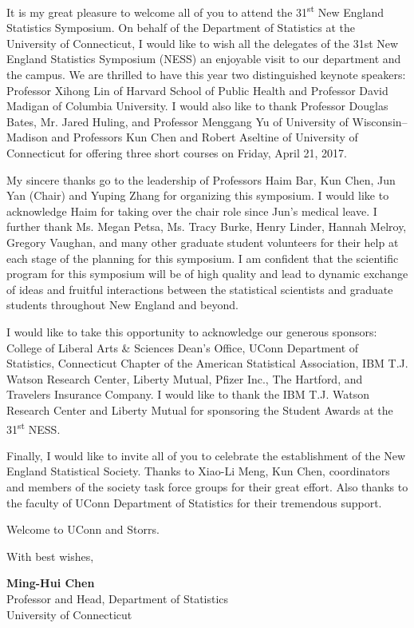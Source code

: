 It is my great pleasure to welcome all of you to attend the
31\textsuperscript{st} New England Statistics Symposium.  On behalf of
the Department of Statistics at the University of Connecticut, I would
like to wish all the delegates of the 31st New England Statistics
Symposium (NESS) an enjoyable visit to our department and the
campus. We are thrilled to have this year two distinguished keynote
speakers: Professor Xihong Lin of Harvard School of Public Health and
Professor David Madigan of Columbia University. I would also like to
thank Professor Douglas Bates, Mr. Jared Huling, and Professor
Menggang Yu of University of Wisconsin–Madison and Professors Kun Chen
and Robert Aseltine of University of Connecticut for offering three
short courses on Friday, April 21, 2017.

My sincere thanks go to the leadership of Professors Haim Bar, Kun
Chen, Jun Yan (Chair) and Yuping Zhang for organizing this
symposium. I would like to acknowledge Haim for taking over the chair
role since Jun’s medical leave.  I further thank Ms. Megan Petsa,
Ms. Tracy Burke, Henry Linder, Hannah Melroy, Gregory Vaughan, and
many other graduate student volunteers for their help at each stage of
the planning for this symposium. I am confident that the scientific
program for this symposium will be of high quality and lead to dynamic
exchange of ideas and fruitful interactions between the statistical
scientists and graduate students throughout New England and beyond.

I would like to take this opportunity to acknowledge our generous
sponsors: College of Liberal Arts \& Sciences Dean’s Office, UConn
Department of Statistics, Connecticut Chapter of the American
Statistical Association, IBM T.J. Watson Research Center, Liberty
Mutual, Pfizer Inc., The Hartford, and Travelers Insurance Company. I
would like to thank the IBM T.J. Watson Research Center and Liberty
Mutual for sponsoring the Student Awards at the 31\textsuperscript{st} NESS.

Finally, I would like to invite all of you to celebrate the
establishment of the New England Statistical Society. Thanks to
Xiao-Li Meng, Kun Chen, coordinators and members of the society task
force groups for their great effort. Also thanks to the faculty of
UConn Department of Statistics for their tremendous support.

Welcome to UConn and Storrs.

With best wishes,

\textbf{Ming-Hui Chen} \\
Professor and Head, Department of Statistics \\
University of Connecticut \\[1em]

